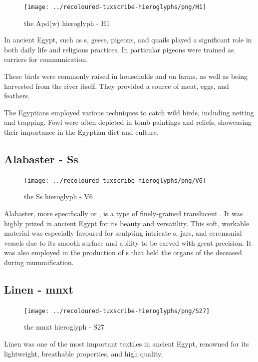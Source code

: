 \begin{figure} [H]
	\centering
	\texttt{[image: ../recoloured-tuxscribe-hieroglyphs/png/H1]}
	\caption{the Apd(w) hieroglyph - H1}
\end{figure}

In ancient Egypt,  such as s, geese, pigeons, and quails played a significant role in both daily life and religious practices. In particular pigeons were trained as carriers for communication.

These birds were commonly raised in households and on farms, as well as being harvested from the river itself. They provided a source of meat, eggs, and feathers.

The Egyptians employed various techniques to catch wild birds, including netting and trapping. Fowl were often depicted in tomb paintings and reliefs, showcasing their importance in the Egyptian diet and culture.

\subsection*{Alabaster - Ss}

\begin{figure} [H]
	\centering
	\texttt{[image: ../recoloured-tuxscribe-hieroglyphs/png/V6]}
	\caption{the Ss hieroglyph - V6}
\end{figure}

Alabaster, more specifically   or , is a type of finely-grained translucent . It was highly prized in ancient Egypt for its beauty and versatility. This soft, workable material was especially favoured for sculpting intricate s, jars, and ceremonial vessels due to its smooth surface and ability to be carved with great precision. It was also employed in the production of s that held the organs of the deceased during mummification.

\subsection*{Linen - mnxt}

\begin{figure} [H]
	\centering
	\texttt{[image: ../recoloured-tuxscribe-hieroglyphs/png/S27]}
	\caption{the mnxt hieroglyph - S27}
\end{figure}

Linen was one of the most important textiles in ancient Egypt, renowned for its lightweight, breathable properties, and high quality.

